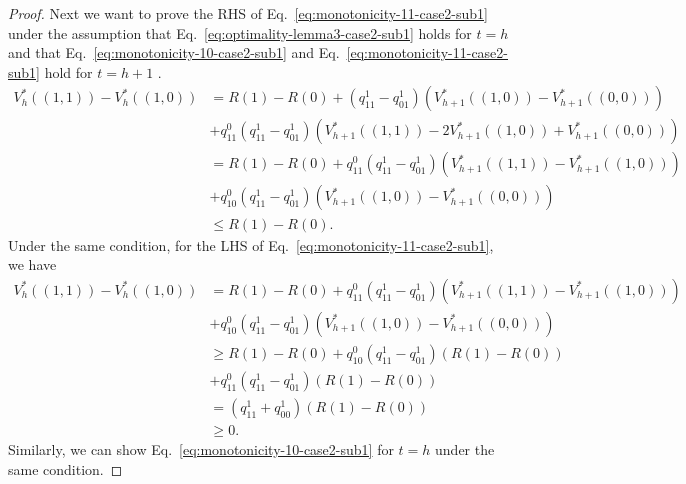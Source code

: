 \begin{proof}
Next we want to prove the RHS of Eq.~\eqref{eq:monotonicity-11-case2-sub1} under the assumption that Eq.~\eqref{eq:optimality-lemma3-case2-sub1} holds for $t=h$ and that Eq.~\eqref{eq:monotonicity-10-case2-sub1} and Eq.~\eqref{eq:monotonicity-11-case2-sub1} hold for $t=h+1$ .
\begin{align*}
     V_{h}^*\left((1,1)\right)-V_h^*\left((1,0)\right)&=R(1)-R(0)+\left(q^1_{11}-q^1_{01}\right)\left(V_{h+1}^*\left((1,0)\right)-V_{h+1}^*\left((0,0)\right)\right)\\
    &+q^0_{11}\left(q^1_{11}-q^1_{01}\right)\left(V_{h+1}^*\left((1,1)\right)-2V_{h+1}^*\left((1,0)\right)+V_{h+1}^*\left((0,0)\right)\right)\\
    &=R(1)-R(0)+q^0_{11}\left(q^1_{11}-q^1_{01}\right)\left(V_{h+1}^*\left((1,1)\right)-V_{h+1}^*\left((1,0)\right)\right)\\&+q^0_{10}\left(q^1_{11}-q^1_{01}\right)\left(V_{h+1}^*\left((1,0)\right)-V_{h+1}^*\left((0,0)\right)\right)\\
    &\leq R(1)-R(0).
\end{align*}
Under the same condition, for the LHS of Eq.~\eqref{eq:monotonicity-11-case2-sub1}, we have
\begin{align*}
     V_{h}^*\left((1,1)\right)-V_h^*\left((1,0)\right)
    &=R(1)-R(0)+q^0_{11}\left(q^1_{11}-q^1_{01}\right)\left(V_{h+1}^*\left((1,1)\right)-V_{h+1}^*\left((1,0)\right)\right)\\&+q^0_{10}\left(q^1_{11}-q^1_{01}\right)\left(V_{h+1}^*\left((1,0)\right)-V_{h+1}^*\left((0,0)\right)\right)\\
    &\geq R(1)-R(0)+q^0_{10}\left(q^1_{11}-q^1_{01}\right)(R(1)-R(0))\\&+q^0_{11}\left(q^1_{11}-q^1_{01}\right)(R(1)-R(0))\\
    &=(q^1_{11}+q^1_{00})(R(1)-R(0))\\
    &\geq 0.
\end{align*}
Similarly, we can show Eq.~\eqref{eq:monotonicity-10-case2-sub1} for $t=h$ under the same condition. 


\end{proof}
